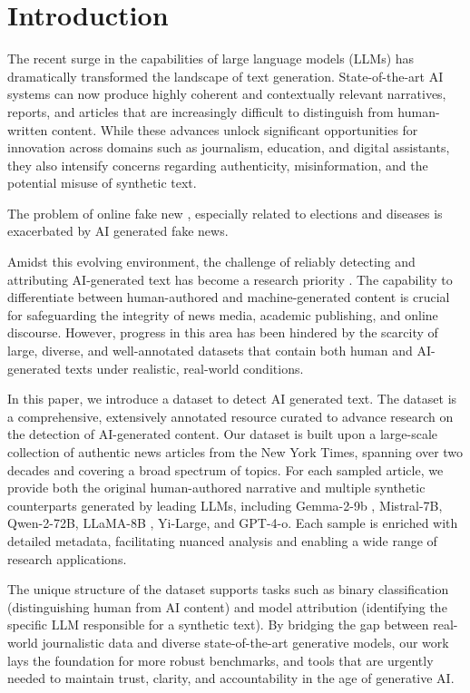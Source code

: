 \section{Introduction}

The recent surge in the capabilities of large language models (LLMs) has dramatically transformed the landscape of text generation. State-of-the-art AI systems can now produce highly coherent and contextually relevant narratives, reports, and articles that are increasingly difficult to distinguish from human-written content. While these advances unlock significant opportunities for innovation across domains such as journalism, education, and digital assistants, they also intensify concerns regarding authenticity, misinformation, and the potential misuse of synthetic text.

The problem of online fake new \cite{}, especially related to elections and diseases \cite{} is exacerbated by AI generated fake news. 

Amidst this evolving environment, the challenge of reliably detecting and attributing AI-generated text has become a research priority \cite{zellers2020defendingneuralfakenews,mitchell2023detectgptzeroshotmachinegeneratedtext}. The capability to differentiate between human-authored and machine-generated content is crucial for safeguarding the integrity of news media, academic publishing, and online discourse. However, progress in this area has been hindered by the scarcity of large, diverse, and well-annotated datasets that contain both human and AI-generated texts under realistic, real-world conditions.

In this paper, we introduce a dataset to detect AI generated text. The dataset is a comprehensive, extensively annotated resource curated to advance research on the detection of AI-generated content. Our dataset is built upon a large-scale collection of authentic news articles from the New York Times, spanning over two decades and covering a broad spectrum of topics. For each sampled article, we provide both the original human-authored narrative and multiple synthetic counterparts generated by leading LLMs, including Gemma-2-9b \cite{gemmateam2024gemma2improvingopen}, Mistral-7B\cite{jiang2023mistral7b}, Qwen-2-72B\cite{bai2023qwentechnicalreport}, LLaMA-8B \cite{touvron2023llamaopenefficientfoundation}, Yi-Large\cite{ai2025yiopenfoundationmodels}, and GPT-4-o\cite{openai2024gpt4technicalreport}. Each sample is enriched with detailed metadata, facilitating nuanced analysis and enabling a wide range of research applications.

The unique structure of the dataset supports tasks such as binary classification (distinguishing human from AI content) and model attribution (identifying the specific LLM responsible for a synthetic text). By bridging the gap between real-world journalistic data and diverse state-of-the-art generative models, our work lays the foundation for more robust benchmarks, and tools that are urgently needed to maintain trust, clarity, and accountability in the age of generative AI.

